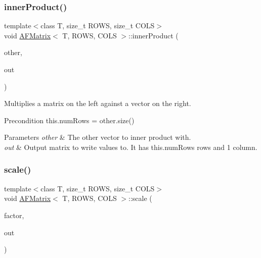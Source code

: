 \subsubsection{\texorpdfstring{inner\+Product()}{innerProduct()}\hspace{0.1cm}{\footnotesize\ttfamily [4/4]}}
{\footnotesize\ttfamily template$<$class T, size\+\_\+t R\+O\+WS, size\+\_\+t C\+O\+LS$>$ \\
void \hyperlink{class_a_f_matrix}{A\+F\+Matrix}$<$ T, R\+O\+WS, C\+O\+LS $>$\+::inner\+Product (\begin{DoxyParamCaption}\item[{array$<$ T, C\+O\+LS $>$ $\ast$}]{other,  }\item[{array$<$ T, R\+O\+WS $>$ $\ast$}]{out }\end{DoxyParamCaption})\hspace{0.3cm}{\ttfamily [inline]}}

Multiplies a matrix on the left against a vector on the right. \begin{DoxyPrecond}{Precondition}
this.\+num\+Rows = other.\+size() 
\end{DoxyPrecond}

\begin{DoxyParams}{Parameters}
{\em other} & The other vector to inner product with. \\
\hline
{\em out} & Output matrix to write values to. It has this.\+num\+Rows rows and 1 column. \\
\hline
\end{DoxyParams}
\mbox{\label{class_a_f_matrix_a905b58769fceaf03972f7ea179ea3934}} 
\subsubsection{\texorpdfstring{scale()}{scale()}}
{\footnotesize\ttfamily template$<$class T, size\+\_\+t R\+O\+WS, size\+\_\+t C\+O\+LS$>$ \\
void \hyperlink{class_a_f_matrix}{A\+F\+Matrix}$<$ T, R\+O\+WS, C\+O\+LS $>$\+::scale (\begin{DoxyParamCaption}\item[{double}]{factor,  }\item[{\hyperlink{class_a_f_matrix}{A\+F\+Matrix}$<$ T, R\+O\+WS, C\+O\+LS $>$ $\ast$}]{out }\end{DoxyParamCaption})\hspace{0.3cm}{\ttfamily [inline]}}


